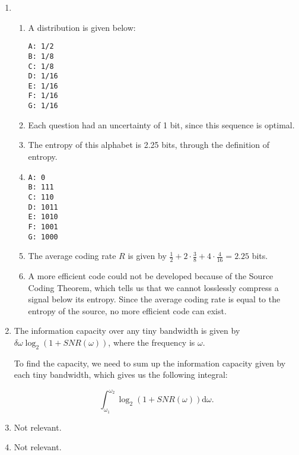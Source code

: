 


\begin{enumerate}[label=(\alph*)]
  \item
    \begin{enumerate}[label=(\roman*)]

      \item
        A distribution is given below:

\begin{verbatim}
A: 1/2
B: 1/8
C: 1/8
D: 1/16
E: 1/16
F: 1/16
G: 1/16
\end{verbatim}

\item
  Each question had an uncertainty of 1 bit, since this sequence is optimal.

\item
  The entropy of this alphabet is 2.25 bits, through the definition of entropy.

\item
\begin{verbatim}
A: 0
B: 111
C: 110
D: 1011
E: 1010
F: 1001
G: 1000
\end{verbatim}


\item
  The average coding rate $R$ is given by $\frac{1}{2} + 2 \cdot \frac{3}{8} + 4 \cdot \frac{4}{16} = 2.25$ bits.

\item
  A more efficient code could not be developed because of the Source Coding Theorem, which tells us that we cannot losslessly compress a signal below its entropy. Since the average coding rate is equal to the entropy of the source, no more efficient code can exist.
        
    \end{enumerate}

  \item

    The information capacity over any tiny bandwidth is given by $\delta \omega \log_2(1 + SNR(\omega))$, where the frequency is $\omega$.

    To find the capacity, we need to sum up the information capacity given by each tiny bandwidth, which gives us the following integral:

    \[
      \int_{\omega_1}^{\omega_2} \log_2(1 + SNR(\omega)) \mathrm{d}\omega
    .\] 

  \item
    Not relevant.

  \item
    Not relevant.

        
\end{enumerate}


